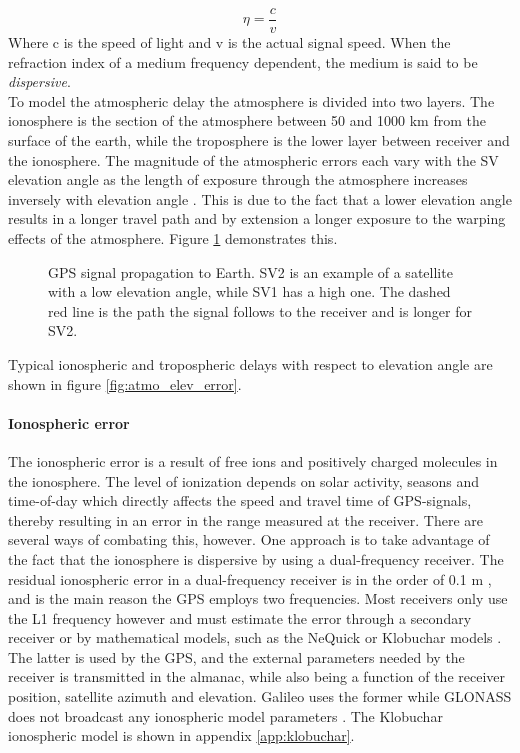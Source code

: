 \begin{equation*}
	\eta = \frac{c}{v}
\end{equation*}
Where c is the speed of light and v is the actual signal speed. When the refraction index of a medium frequency dependent, the medium is said to be \textit{dispersive}.\\

To model the atmospheric delay the atmosphere is divided into two layers. The ionosphere is the section of the atmosphere between 50 and 1000 km from the surface of the earth, while the troposphere is the lower layer between receiver and the ionosphere. The magnitude of the atmospheric errors each vary with the SV elevation angle as the length of exposure through the atmosphere increases inversely with elevation angle \cite{farrell2008aided, groves2013principles}. This is due to the fact that a lower elevation angle results in a longer travel path and by extension a longer exposure to the warping effects of the atmosphere. Figure \ref{fig:signal_prop} demonstrates this.\\

\begin{figure}[!htbp]
	\centering
	
    \caption[GPS signal propagation to Earth]{GPS signal propagation to Earth. SV2 is an example of a satellite with a low elevation angle, while SV1 has a high one. The dashed red line is the path the signal follows to the receiver and is longer for SV2.}
    \label{fig:signal_prop}
\end{figure}

Typical ionospheric and tropospheric delays with respect to elevation angle are shown in figure \ref{fig:atmo_elev_error}. 

\paragraph{Ionospheric error}
The ionospheric error is a result of free ions and positively charged molecules in the ionosphere. The level of ionization depends on solar activity, seasons and time-of-day which directly affects the speed and travel time of GPS-signals, thereby resulting in an error in the range measured at the receiver. There are several ways of combating this, however. One approach is to take advantage of the fact that the ionosphere is dispersive by using a dual-frequency receiver. The residual ionospheric error in a dual-frequency receiver is in the order of 0.1 m \cite{groves2013principles}, and is the main reason the GPS employs two frequencies. Most receivers only use the L1 frequency however and must estimate the error through a secondary receiver or by mathematical models, such as the NeQuick \cite{di1990analytical} or Klobuchar models \cite{klobuchar1987ionospheric}. The latter is used by the GPS, and the external parameters needed by the receiver is transmitted in the almanac, while also being a function of the receiver position, satellite azimuth and elevation. Galileo uses the former while GLONASS does not broadcast any ionospheric model parameters \cite{groves2013principles}. The Klobuchar ionospheric model is shown in appendix \ref{app:klobuchar}.\\

